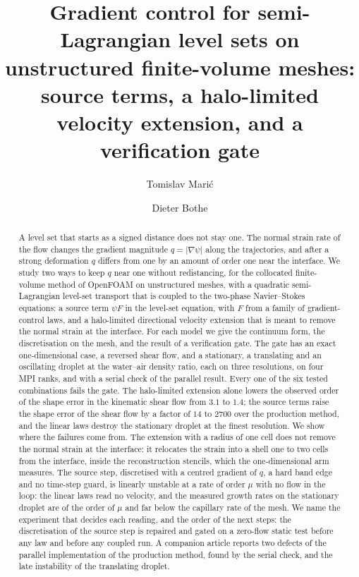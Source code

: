 \documentclass[preprint,3p,11pt]{elsarticle}
\newcommand{\psilev}{\psi}
\begin{document}
\begin{frontmatter}

\title{Gradient control for semi-Lagrangian level sets on unstructured finite-volume
meshes: source terms, a halo-limited velocity extension, and a verification gate}

\author[tuda]{Tomislav Mari\'{c}}
\author[tuda]{Dieter Bothe}
\address[tuda]{Mathematical Modeling and Analysis, TU Darmstadt, Germany}

\begin{abstract}
A level set that starts as a signed distance does not stay one. The normal strain
rate of the flow changes the gradient magnitude $q=|\nabla\psilev|$ along the
trajectories, and after a strong deformation $q$ differs from one by an amount of
order one near the interface. We study two ways to keep $q$ near one without
redistancing, for the collocated finite-volume method of OpenFOAM on unstructured
meshes, with a quadratic semi-Lagrangian level-set transport that is coupled to the
two-phase Navier--Stokes equations: a source term $\psilev F$ in the level-set
equation, with $F$ from a family of gradient-control laws, and a halo-limited
directional velocity extension that is meant to remove the normal strain at the
interface. For each model we give the continuum form, the discretisation on the mesh,
and the result of a verification gate. The gate has an exact one-dimensional case, a
reversed shear flow, and a stationary, a translating and an oscillating droplet at the
water--air density ratio, each on three resolutions, on four MPI ranks, and with a
serial check of the parallel result. Every one of the six tested combinations fails
the gate. The halo-limited extension alone lowers the observed order of the shape
error in the kinematic shear flow from $3.1$ to $1.4$; the source terms raise the
shape error of the shear flow by a factor of $14$ to $2700$ over the production
method, and the linear laws destroy the stationary droplet at the finest resolution.
We show where the failures come from. The extension with a radius of one cell does
not remove the normal strain at the interface: it relocates the strain into a shell
one to two cells from the interface, inside the reconstruction stencils, which the
one-dimensional arm measures. The source step, discretised with a centred gradient
of $q$, a hard band edge and no time-step guard, is linearly unstable at a rate of
order $\mu$ with no flow in the loop: the linear laws read no velocity, and the
measured growth rates on the stationary droplet are of the order of $\mu$ and far
below the capillary rate of the mesh. We name the experiment that decides each
reading, and the order of the next steps: the discretisation of the source step is
repaired and gated on a zero-flow static test before any law and before any coupled
run. A companion article reports two defects of the parallel implementation of the
production method, found by the serial check, and the late instability of the
translating droplet.
\end{abstract}


\end{frontmatter}
\end{document}
